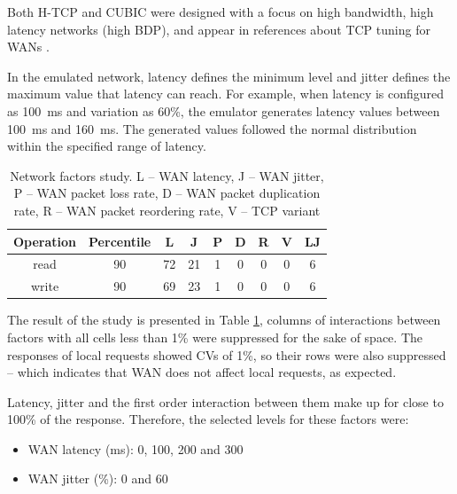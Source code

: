 \documentclass[man,floatsintext,12pt]{apa6}
\begin{document}
Both H-TCP and CUBIC were designed with a focus on high bandwidth, high latency
networks (high BDP), and appear in references about TCP tuning for WANs
\parencite{ESnet2012}.

In the emulated network, latency defines the minimum level and jitter defines
the maximum value that latency can reach. For example, when latency is
configured as 100~ms and variation as 60\%, the emulator generates latency
values between 100~ms and 160~ms. The generated values followed the normal
distribution within the specified range of latency.

\begin{table}[h!]
\caption{Network factors study. L -- WAN latency, J -- WAN jitter, P -- WAN
packet loss rate, D -- WAN packet duplication rate, R -- WAN packet reordering
rate, V -- TCP variant}
\begin{tabular}{ccccccccc} \toprule

Operation & Percentile & L & J & P & D & R & V & LJ\\ \midrule

read & 90 & 72 & 21 & 1 & 0 & 0 & 0 & 6\\

write & 90 & 69 & 23 & 1 & 0 & 0 & 0 & 6\\ \bottomrule

\end{tabular}
\label{tab:estudo_para_fatores_de_rede}

\end{table}

The result of the study is presented in Table
\ref{tab:estudo_para_fatores_de_rede}, columns of interactions between factors
with all cells less than 1\% were suppressed for the sake of space. The
responses of local requests showed CVs of 1\%, so their rows were also
suppressed -- which indicates that WAN does not affect local requests, as
expected.

Latency, jitter and the first order interaction between them make up for close to 100\% of the response. Therefore, the selected levels for
these factors were:

\begin{itemize}

\item WAN latency (ms): 0, 100, 200 and 300

\item WAN jitter (\%): 0 and 60

\end{itemize}
\end{document}
